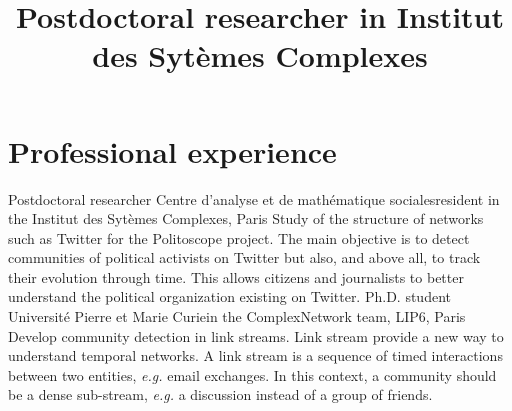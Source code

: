 \documentclass[11pt,a4paper]{moderncv}
\title{Postdoctoral researcher in Institut des Sytèmes Complexes }
\begin{document}
\maketitle
\vspace{-1.2cm}

\section{Professional experience}
 {Postdoctoral researcher} {Centre d’analyse et de mathématique sociales}{}{resident in the Institut des Sytèmes Complexes, Paris}
{
	Study of the structure of networks such as Twitter for the Politoscope project. The main objective is to detect communities of political activists on Twitter but also, and above all, to track their evolution through time. This allows citizens and journalists to better understand the political organization existing on Twitter.
}
\vspace*{0.2cm}
 {Ph.D. student} {Université Pierre et Marie Curie}{}{in the ComplexNetwork team, LIP6, Paris}
{
 Develop community detection in link streams. Link stream provide a new way to understand temporal networks.
A link stream is a sequence of timed interactions between two entities, \emph{e.g.} email exchanges.
In this context, a community should be a dense sub-stream, \emph{e.g.} a discussion instead of a group of
friends.
}
\vspace*{0.2cm}
%
\vspace*{0.2cm}


\end{document}
